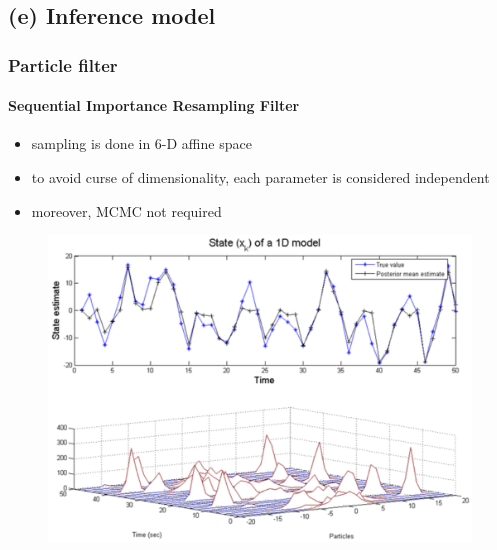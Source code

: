 \subsection{(e) Inference model}
\begin{frame}
\frametitle{Particle filter}
\framesubtitle{Sequential Importance Resampling Filter}
\logoCSIPCPL\mypagenum
\begin{itemize}
\item sampling is done in 6-D affine space
\item to avoid curse of dimensionality, each parameter is considered independent
\item moreover, MCMC not required
\end{itemize}
\begin{figure}
\includegraphics[width=1.0\textwidth]{thesis/TRK_ParticleFilter_multimodalPDF.pdf}
\end{figure}	
\end{frame}






